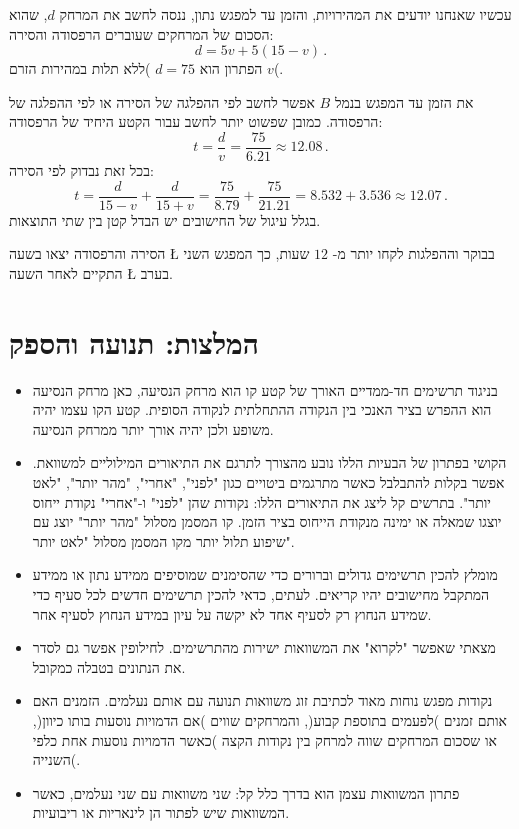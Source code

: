 עכשיו שאנחנו יודעים את המהירויות, והזמן עד למפגש נתון, ננסה לחשב את המרחק 
$d$,
שהוא הסכום של המרחקים שעוברים הרפסודה והסירה:
\[
d = 5v + 5(15-v)\,.
\]
הפתרון הוא
$d=75$
)ללא תלות במהירות הזרם
$v$(.

\smallskip

את הזמן עד המפגש בנמל 
$B$
אפשר לחשב לפי ההפלגה של הסירה או לפי ההפלגה של הרפסודה. כמובן שפשוט יותר לחשב עבור הקטע היחיד של הרפסודה:
\[
t = \frac{d}{v} = \frac{75}{6.21} \approx 12.08\,.
\]
בכל זאת נבדוק לפי הסירה:
\[
t = \frac{d}{15-v} + \frac{d}{15+v} = \frac{75}{8.79} + \frac{75}{21.21}= 8.532 + 3.536 \approx 12.07\,.
\]
בגלל עיגול של החישובים יש הבדל קטן בין שתי התוצאות.

הסירה והרפסודה יצאו בשעה
\L{}
בבוקר וההפלגות לקחו יותר מ-%
$12$
שעות, כך המפגש השני התקיים לאחר השעה
\L{}
בערב.



\clearpage
{}


\section{המלצות: תנועה והספק}


\begin{itemize}

\item
בניגוד תרשימים חד-ממדיים האורך של קטע קו הוא מרחק הנסיעה, כאן מרחק הנסיעה הוא ההפרש בציר האנכי בין הנקודה ההתחלתית לנקודה הסופית. קטע הקו עצמו יהיה משופע ולכן יהיה אורך יותר ממרחק הנסיעה.

\item
הקושי בפתרון של הבעיות הללו נובע מהצורך לתרגם את התיאורים המילוליים למשוואת. אפשר בקלות להתבלבל כאשר מתרגמים ביטויים כגון "לפני", "אחרי", "מהר יותר", "לאט יותר".  בתרשים קל ליצג את התיאורים הללו: נקודות שהן "לפני" ו-"אחרי" נקודת ייחוס יוצגו שמאלה או ימינה מנקודת הייחוס בציר הזמן. קו המסמן מסלול "מהר יותר" יוצג עם שיפוע תלול יותר מקו המסמן מסלול "לאט יותר".

\item
מומלץ להכין תרשימים גדולים וברורים כדי שהסימנים שמוסיפים ממידע נתון או ממידע המתקבל מחישובים יהיו קריאים. לעתים, כדאי להכין תרשימים חדשים לכל סעיף כדי שמידע הנחוץ רק לסעיף אחד לא יקשה על עיון במידע הנחוץ לסעיף אחר.

\item
מצאתי שאפשר "לקרוא" את המשוואות ישירות מהתרשימים. לחילופין אפשר גם לסדר את הנתונים בטבלה כמקובל.

\item 
נקודות מפגש נוחות מאוד לכתיבת זוג משוואות תנועה עם אותם נעלמים. הזמנים האם אותם זמנים )לפעמים בתוספת קבוע(, והמרחקים שווים )אם הדמויות נוסעות בותו כיוון(, או שסכום המרחקים שווה למרחק בין נקודות הקצה )כאשר הדמויות נוסעות אחת כלפי השנייה(.

\item 
פתרון המשוואות עצמן הוא בדרך כלל קל: שני משוואות עם שני נעלמים, כאשר המשוואות שיש לפתור הן לינאריות או ריבועיות.

\end{itemize}
